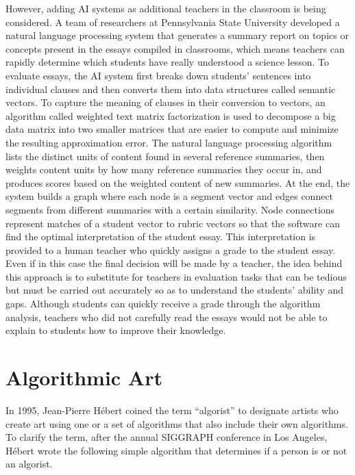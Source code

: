 However, adding AI systems as additional teachers in the classroom is being considered. A team of researchers at Pennsylvania State University developed a natural language processing system that generates a summary report on topics or concepts present in the essays compiled in classrooms, which means teachers can rapidly determine which students have really understood a science lesson. To evaluate essays, the AI system first breaks down students' sentences into individual clauses and then converts them into data structures called semantic vectors. To capture the meaning of clauses in their conversion to vectors, an algorithm called weighted text matrix factorization is used to decompose a big data matrix into two smaller matrices that are easier to compute and minimize the resulting approximation error. The natural language processing algorithm lists the distinct units of content found in several reference summaries, then weights content units by how many reference summaries they occur in, and produces scores based on the weighted content of new summaries. At the end, the system builds a graph where each node is a segment vector and edges connect segments from different summaries with a certain similarity. Node connections represent matches of a student vector to rubric vectors so that the software can find the optimal interpretation of the student essay. This interpretation is provided to\vadjust{\vspace*{10pt}\pagebreak} a human teacher who quickly assigns a grade to the student essay. Even if in this case the final decision will be made by a teacher, the idea behind this approach is to substitute for teachers in evaluation tasks that can be tedious but must be carried out accurately so as to understand the students' ability and gaps. Although students can quickly receive a grade through the algorithm analysis, teachers who did not carefully read the essays would not be able to explain to students how to improve their knowledge.

\section{\label{sec:5.6}Algorithmic Art}

In 1995, Jean-Pierre H\'{e}bert coined the term ``algorist'' to designate artists who create art using one or a set of algorithms that also include their own algorithms. To clarify the term, after the annual SIGGRAPH conference in Los Angeles, H\'{e}bert wrote the following simple algorithm that determines if a person is or not an algorist.

